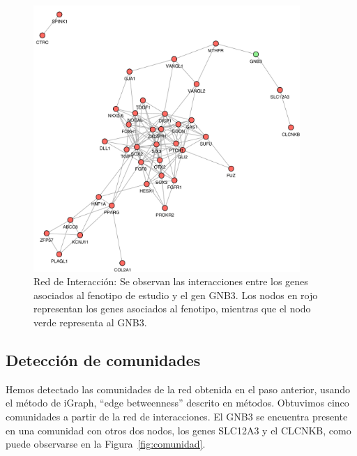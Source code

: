 \begin{figure}[h!]
	\includegraphics[width=0.9\textwidth]{figures/network.pdf}
	\caption{Red de Interacción: Se observan las interacciones entre los genes asociados al fenotipo de estudio y el gen GNB3. Los nodos en rojo representan los genes asociados al fenotipo, mientras que el nodo verde representa al GNB3.}
	\label{fig:network}
\end{figure}

\subsection{Detección de comunidades}

Hemos detectado las comunidades de la red obtenida en el paso anterior, usando el método de iGraph, ``edge betweenness'' descrito en métodos. Obtuvimos cinco comunidades a partir de la red de interacciones. El GNB3 se encuentra presente en una comunidad con otros dos nodos, los genes SLC12A3 y el CLCNKB, como puede observarse en la Figura~\ref{fig:comunidad}.

